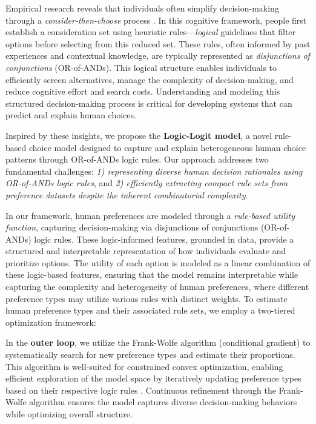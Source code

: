 \documentclass{article} %
\begin{document}
Empirical research reveals that individuals often simplify decision-making through a {\it consider-then-choose} process \citep{hauser2014consideration}. In this cognitive framework, people first establish a consideration set using heuristic rules—{\it logical} guidelines that filter options before selecting from this reduced set. These rules, often informed by past experiences and contextual knowledge, are typically represented as {\it disjunctions of conjunctions} (OR-of-ANDs). This logical structure enables individuals to efficiently screen alternatives, manage the complexity of decision-making, and reduce cognitive effort and search costs. Understanding and modeling this structured decision-making process is critical for developing systems that can predict and explain human choices.

Inspired by these insights, we propose the {\bf Logic-Logit model}, a novel rule-based choice model designed to capture and explain heterogeneous human choice patterns through OR-of-ANDs logic rules. Our approach addresses two fundamental challenges: {\it 1)  representing diverse human decision rationales using OR-of-ANDs logic rules}, and {\it 2)  efficiently extracting compact rule sets from preference datasets despite the inherent combinatorial complexity}.

In our framework, human preferences are modeled through a {\it rule-based utility function}, capturing decision-making via disjunctions of conjunctions (OR-of-ANDs) logic rules. These logic-informed features, grounded in data, provide a structured and interpretable representation of how individuals evaluate and prioritize options. The utility of each option is modeled as a linear combination of these logic-based features, ensuring that the model remains interpretable while capturing the complexity and heterogeneity of human preferences, where different preference types may utilize various rules with distinct weights. To estimate human preference types and their associated rule sets, we employ a two-tiered optimization framework:

In the {\bf outer loop}, we utilize the Frank-Wolfe algorithm (conditional gradient) to systematically search for new preference types and estimate their proportions. This algorithm is well-suited for constrained convex optimization, enabling efficient exploration of the model space by iteratively updating preference types based on their respective logic rules \citep{jagabathula2020conditional}. Continuous refinement through the Frank-Wolfe algorithm ensures the model captures diverse decision-making behaviors while optimizing overall structure.
\end{document}
